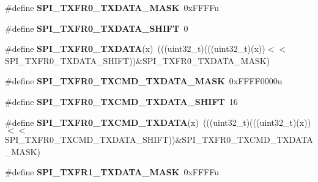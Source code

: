 \begin{DoxyCompactItemize}
\item 
\#define {\bfseries S\+P\+I\+\_\+\+T\+X\+F\+R0\+\_\+\+T\+X\+D\+A\+T\+A\+\_\+\+M\+A\+SK}~0x\+F\+F\+F\+Fu\hypertarget{group__SPI__Register__Masks_ga9a231481c0385058731013344776a9f1}{}\label{group__SPI__Register__Masks_ga9a231481c0385058731013344776a9f1}

\item 
\#define {\bfseries S\+P\+I\+\_\+\+T\+X\+F\+R0\+\_\+\+T\+X\+D\+A\+T\+A\+\_\+\+S\+H\+I\+FT}~0\hypertarget{group__SPI__Register__Masks_ga8f072c39e4ee2cddff2444298fc92be0}{}\label{group__SPI__Register__Masks_ga8f072c39e4ee2cddff2444298fc92be0}

\item 
\#define {\bfseries S\+P\+I\+\_\+\+T\+X\+F\+R0\+\_\+\+T\+X\+D\+A\+TA}(x)~(((uint32\+\_\+t)(((uint32\+\_\+t)(x))$<$$<$S\+P\+I\+\_\+\+T\+X\+F\+R0\+\_\+\+T\+X\+D\+A\+T\+A\+\_\+\+S\+H\+I\+FT))\&S\+P\+I\+\_\+\+T\+X\+F\+R0\+\_\+\+T\+X\+D\+A\+T\+A\+\_\+\+M\+A\+SK)\hypertarget{group__SPI__Register__Masks_gae09e375e6cc7f496ac90d900888f7d9c}{}\label{group__SPI__Register__Masks_gae09e375e6cc7f496ac90d900888f7d9c}

\item 
\#define {\bfseries S\+P\+I\+\_\+\+T\+X\+F\+R0\+\_\+\+T\+X\+C\+M\+D\+\_\+\+T\+X\+D\+A\+T\+A\+\_\+\+M\+A\+SK}~0x\+F\+F\+F\+F0000u\hypertarget{group__SPI__Register__Masks_ga2d7e46a45e284b2a837f0dfa4103c9cc}{}\label{group__SPI__Register__Masks_ga2d7e46a45e284b2a837f0dfa4103c9cc}

\item 
\#define {\bfseries S\+P\+I\+\_\+\+T\+X\+F\+R0\+\_\+\+T\+X\+C\+M\+D\+\_\+\+T\+X\+D\+A\+T\+A\+\_\+\+S\+H\+I\+FT}~16\hypertarget{group__SPI__Register__Masks_gad5b1e75e9410e41d3c81384798040284}{}\label{group__SPI__Register__Masks_gad5b1e75e9410e41d3c81384798040284}

\item 
\#define {\bfseries S\+P\+I\+\_\+\+T\+X\+F\+R0\+\_\+\+T\+X\+C\+M\+D\+\_\+\+T\+X\+D\+A\+TA}(x)~(((uint32\+\_\+t)(((uint32\+\_\+t)(x))$<$$<$S\+P\+I\+\_\+\+T\+X\+F\+R0\+\_\+\+T\+X\+C\+M\+D\+\_\+\+T\+X\+D\+A\+T\+A\+\_\+\+S\+H\+I\+FT))\&S\+P\+I\+\_\+\+T\+X\+F\+R0\+\_\+\+T\+X\+C\+M\+D\+\_\+\+T\+X\+D\+A\+T\+A\+\_\+\+M\+A\+SK)\hypertarget{group__SPI__Register__Masks_ga7534e83201b7ea6c7beb55f2ed16ecaa}{}\label{group__SPI__Register__Masks_ga7534e83201b7ea6c7beb55f2ed16ecaa}

\item 
\#define {\bfseries S\+P\+I\+\_\+\+T\+X\+F\+R1\+\_\+\+T\+X\+D\+A\+T\+A\+\_\+\+M\+A\+SK}~0x\+F\+F\+F\+Fu\hypertarget{group__SPI__Register__Masks_ga1264b5c9bd3d50782925741457405b2d}{}\label{group__SPI__Register__Masks_ga1264b5c9bd3d50782925741457405b2d}


\end{DoxyCompactItemize}
